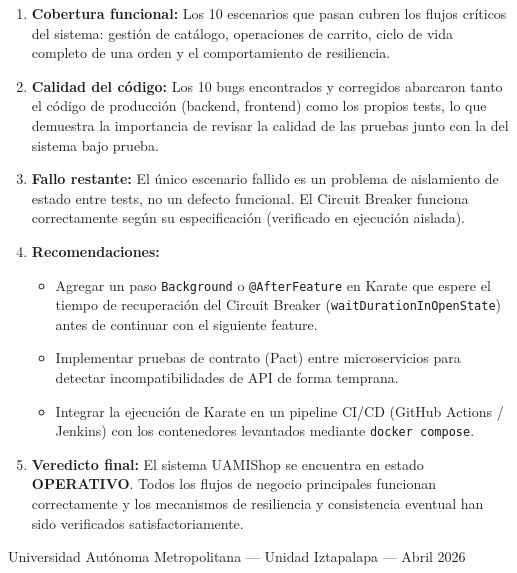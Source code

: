 \documentclass[12pt,a4paper]{article}
\begin{document}
\begin{enumerate}
  \item \textbf{Cobertura funcional:} Los 10 escenarios que pasan cubren los flujos
        cr\'iticos del sistema: gesti\'on de cat\'alogo, operaciones de carrito,
        ciclo de vida completo de una orden y el comportamiento de resiliencia.

  \item \textbf{Calidad del c\'odigo:} Los 10 bugs encontrados y corregidos abarcaron
        tanto el c\'odigo de producci\'on (backend, frontend) como los propios tests,
        lo que demuestra la importancia de revisar la calidad de las pruebas junto con
        la del sistema bajo prueba.

  \item \textbf{Fallo restante:} El \'unico escenario fallido es un problema de
        aislamiento de estado entre tests, no un defecto funcional. El Circuit Breaker
        funciona correctamente seg\'un su especificaci\'on (verificado en ejecuci\'on
        aislada).

  \item \textbf{Recomendaciones:}
        \begin{itemize}
          \item Agregar un paso \texttt{Background} o \texttt{@AfterFeature} en Karate
                que espere el tiempo de recuperaci\'on del Circuit Breaker (\texttt{waitDurationInOpenState}) antes de continuar con el siguiente feature.
          \item Implementar pruebas de contrato (Pact) entre microservicios para detectar
                incompatibilidades de API de forma temprana.
          \item Integrar la ejecuci\'on de Karate en un pipeline CI/CD (GitHub Actions /
                Jenkins) con los contenedores levantados mediante \texttt{docker compose}.
        \end{itemize}

  \item \textbf{Veredicto final:} El sistema UAMIShop se encuentra en estado
        \textbf{OPERATIVO}. Todos los flujos de negocio principales funcionan
        correctamente y los mecanismos de resiliencia y consistencia eventual han
        sido verificados satisfactoriamente.
\end{enumerate}

\vfill
\begin{center}
  \small Universidad Aut\'onoma Metropolitana --- Unidad Iztapalapa --- Abril 2026
\end{center}
\end{document}
